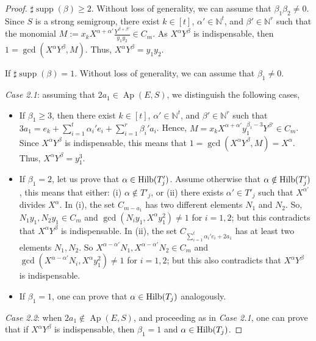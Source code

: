 \documentclass[a4paper,11pt]{article}
\def\N{\mathbb{N}}
\def\Ap{\operatorname{Ap}}
\def\supp{\operatorname{supp}}
\begin{document}
{\begin{proof}
 $\sharp \supp (\beta)\ge 2$. Without loss of generality, we can assume that $\beta_1\beta_2\neq 0$. Since $S$ is a strong semigroup, there exist $k\in [t]$, $\alpha'\in \N^t$, and $\beta'\in \N^r$ such that the monomial $M := x_kX^{\alpha+ \alpha'}\frac{Y^{\beta + \beta'}}{y_1y_2} \in C_m$. As $X^\alpha Y^\beta$ is indispensable, then $1 = \gcd(X^\alpha Y^\beta, M).$ Thus, $X^\alpha Y^\beta = y_1 y_2$.

 If $\sharp \supp (\beta) = 1$. Without loss of generality, we can assume that $\beta_1 \neq 0.$

{\em Case 2.1}: assuming that $2a_1 \in \Ap(E,S)$, we distinguish the following cases,

\begin{itemize}
\item If $\beta_1 \geq 3$, then  there exist $k\in [t]$, $\alpha'\in \N^t$, and $\beta'\in \N^r$ such that $3 a_1 = e_k + \sum_{i = 1}^t \alpha_i' e_i + \sum_{i = 1}^r \beta_i' a_i$. Hence, $M = x_k X^{\alpha + \alpha'} y_1^{\beta_1 - 3} Y^{\beta'}\in C_m$. Since $X^\alpha Y^{\beta}$ is indispensable, this means that $1 = \gcd(X^\alpha Y^\beta, M) = X^{\alpha}.$ Thus, $X^\alpha Y^\beta = y_1^3$.

\item  If $\beta_1 = 2$, let us prove that $\alpha \in {\rm Hilb} (T'_j)$. Assume otherwise that $\alpha \notin {\rm Hilb} (T'_j)$, this means that either: (i) $\alpha \notin T'_j$, or (ii) there exists $\alpha' \in T'_j$ such that $X^{\alpha'}$ divides $X^{\alpha}$. In (i), the set $C_{m-a_1}$ has two different elements $N_1$ and $N_2$. So, $N_1 y_1, N_2 y_1 \in C_{m}$ and $\gcd(N_iy_1,X^\alpha y_1^2) \neq 1$ for $i = 1,2$; but this contradicts that $X^{\alpha} Y^{\beta}$ is indispensable. In (ii), the set $C_{\sum_{i = 1}^t \alpha_i'e_i + 2 a_1}$ has at least two elements $N_1, N_2$. So  $X^{\alpha - \alpha'}N_1, X^{\alpha - \alpha'} N_2 \in C_{m}$ and $\gcd(X^{\alpha - \alpha'} N_i,X^\alpha y_1^2) \neq 1$ for $i = 1,2$; but this also contradicts that $X^{\alpha} Y^{\beta}$ is indispensable.

\item  If $\beta_1 = 1$, one can prove that $\alpha \in {\rm Hilb} (T_j)$ analogously.
\end{itemize}

{\em Case 2.2}: when $2a_1 \notin \Ap(E,S)$, and proceeding as in {\em Case 2.1}, one can prove that if $X^{\alpha}Y^{\beta}$ is indispensable, then $\beta_1 = 1$ and $\alpha \in {\rm Hilb} (T_j)$.
\end{proof}

}
\end{document}
